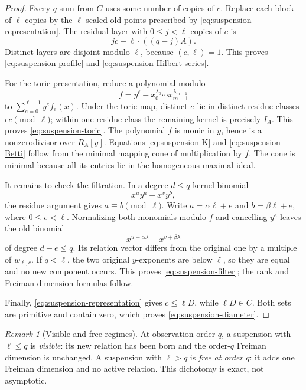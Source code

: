 \documentclass[11pt,reqno]{amsart}
\theoremstyle{definition}
\theoremstyle{remark}
\newtheorem{remark}[theorem]{Remark}
\begin{document}
\begin{proof}
Every $q$-sum from $C$ uses some number of copies of $c$.
Replace each block of $\ell$ copies by the $\ell$ scaled old points prescribed
by \eqref{eq:suspension-representation}.  The residual layer with
$0\leq j<\ell$ copies of $c$ is
\[
 jc+\ell\mathbin{\cdot}((q-j)A).
\]
Distinct layers are disjoint modulo $\ell$, because $(c,\ell)=1$.
This proves \eqref{eq:suspension-profile} and
\eqref{eq:suspension-Hilbert-series}.

For the toric presentation, reduce a polynomial modulo
\[
 f=y^\ell-x_0^{\lambda_0}\cdots x_{m-1}^{\lambda_{m-1}}
\]
to $\sum_{e=0}^{\ell-1}y^ef_e(x)$.  Under the toric map, distinct $e$ lie
in distinct residue classes $ec\pmod\ell$; within one residue class the
remaining kernel is precisely $I_A$.  This proves
\eqref{eq:suspension-toric}.
The polynomial $f$ is monic in $y$, hence is a nonzerodivisor over $R_A[y]$.
Equations \eqref{eq:suspension-K} and \eqref{eq:suspension-Betti} follow from
the minimal mapping cone of multiplication by $f$.  The cone is minimal
because all its entries lie in the homogeneous maximal ideal.

It remains to check the filtration.  In a degree-$d\leq q$ kernel binomial
\[
 x^u y^a-x^v y^b,
\]
the residue argument gives $a\equiv b\pmod\ell$.  Write
$a=\alpha\ell+e$ and $b=\beta\ell+e$, where $0\leq e<\ell$.
Normalizing both monomials modulo $f$ and cancelling $y^e$ leaves the old
binomial
\[
 x^{u+\alpha\lambda}-x^{v+\beta\lambda}
\]
of degree $d-e\leq q$.  Its relation vector differs from the original one
by a multiple of $w_{\ell,c}$.  If $q<\ell$, the two original
$y$-exponents are below $\ell$, so they are equal and no new component
occurs.  This proves \eqref{eq:suspension-filter}; the rank and Freiman
dimension formulas follow.

Finally, \eqref{eq:suspension-representation} gives $c\leq\ell D$, while
$\ell D\in C$.  Both sets are primitive and contain zero, which proves
\eqref{eq:suspension-diameter}.
\end{proof}

\begin{remark}[Visible and free regimes]
\label{rem:suspension-visible-free}
At observation order $q$, a suspension with $\ell\leq q$ is
\emph{visible}: its new relation has been born and the order-$q$ Freiman
dimension is unchanged.  A suspension with $\ell>q$ is \emph{free at order
$q$}: it adds one Freiman dimension and no active relation.  This dichotomy
is exact, not asymptotic.
\end{remark}
\end{document}
